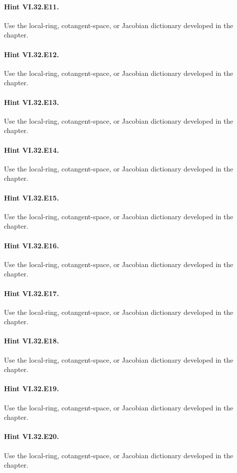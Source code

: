 \paragraph{Hint VI.32.E11.} Use the local-ring, cotangent-space, or Jacobian dictionary developed in the chapter.
\paragraph{Hint VI.32.E12.} Use the local-ring, cotangent-space, or Jacobian dictionary developed in the chapter.
\paragraph{Hint VI.32.E13.} Use the local-ring, cotangent-space, or Jacobian dictionary developed in the chapter.
\paragraph{Hint VI.32.E14.} Use the local-ring, cotangent-space, or Jacobian dictionary developed in the chapter.
\paragraph{Hint VI.32.E15.} Use the local-ring, cotangent-space, or Jacobian dictionary developed in the chapter.
\paragraph{Hint VI.32.E16.} Use the local-ring, cotangent-space, or Jacobian dictionary developed in the chapter.
\paragraph{Hint VI.32.E17.} Use the local-ring, cotangent-space, or Jacobian dictionary developed in the chapter.
\paragraph{Hint VI.32.E18.} Use the local-ring, cotangent-space, or Jacobian dictionary developed in the chapter.
\paragraph{Hint VI.32.E19.} Use the local-ring, cotangent-space, or Jacobian dictionary developed in the chapter.
\paragraph{Hint VI.32.E20.} Use the local-ring, cotangent-space, or Jacobian dictionary developed in the chapter.
